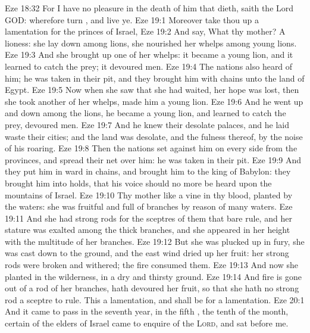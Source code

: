 \vs Eze 18:32 For I have no pleasure in the death of him that dieth, saith the Lord GOD: wherefore turn , and live ye.
\vs Eze 19:1 Moreover take thou up a lamentation for the princes of Israel,
\vs Eze 19:2 And say, What  thy mother? A lioness: she lay down among lions, she nourished her whelps among young lions.
\vs Eze 19:3 And she brought up one of her whelps: it became a young lion, and it learned to catch the prey; it devoured men.
\vs Eze 19:4 The nations also heard of him; he was taken in their pit, and they brought him with chains unto the land of Egypt.
\vs Eze 19:5 Now when she saw that she had waited,  her hope was lost, then she took another of her whelps,  made him a young lion.
\vs Eze 19:6 And he went up and down among the lions, he became a young lion, and learned to catch the prey,  devoured men.
\vs Eze 19:7 And he knew their desolate palaces, and he laid waste their cities; and the land was desolate, and the fulness thereof, by the noise of his roaring.
\vs Eze 19:8 Then the nations set against him on every side from the provinces, and spread their net over him: he was taken in their pit.
\vs Eze 19:9 And they put him in ward in chains, and brought him to the king of Babylon: they brought him into holds, that his voice should no more be heard upon the mountains of Israel.
\vs Eze 19:10 Thy mother  like a vine in thy blood, planted by the waters: she was fruitful and full of branches by reason of many waters.
\vs Eze 19:11 And she had strong rods for the sceptres of them that bare rule, and her stature was exalted among the thick branches, and she appeared in her height with the multitude of her branches.
\vs Eze 19:12 But she was plucked up in fury, she was cast down to the ground, and the east wind dried up her fruit: her strong rods were broken and withered; the fire consumed them.
\vs Eze 19:13 And now she  planted in the wilderness, in a dry and thirsty ground.
\vs Eze 19:14 And fire is gone out of a rod of her branches,  hath devoured her fruit, so that she hath no strong rod  a sceptre to rule. This  a lamentation, and shall be for a lamentation.
\vs Eze 20:1 And it came to pass in the seventh year, in the fifth , the tenth  of the month,  certain of the elders of Israel came to enquire of the \textsc{Lord}, and sat before me.
